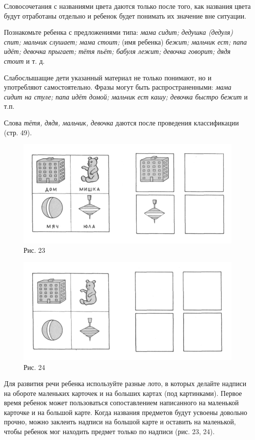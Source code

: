 \documentclass{book}
\renewcommand{\emph}[1]{\textit{#1}}
\begin{document}
Словосочетания с названиями цвета даются только после того, как названия
цвета будут отработаны отдельно и ребенок будет понимать их значение вне
ситуации.

Познакомьте ребенка с предложениями типа: \emph{мама сидит; дедушка
(дедуля) спит; мальчик слушает; мама стоит;} (имя ребенка) \emph{бежит;
мальчик ест; папа идёт; девочка прыгает; тётя пьёт; бабуля лежит;
девочка говорит; дядя стоит} и т. д.

Слабослышащие дети указанный материал не только понимают, но и
употребляют самостоятельно. Фразы могут быть распространенными:
\emph{мама сидит на стуле; папа идёт домой; мальчик ест кашу; девочка
быстро бежит} и т.п.

Слова \emph{тётя, дядя, мальчик, девочка} даются после проведения
классификации (стр. 49).

\begin{figure}
\centering
\includegraphics[width=\linewidth]{media/media/image20.png}
\caption*{Рис. 23}
\end{figure}

\begin{figure}
\centering
\includegraphics[width=\linewidth]{media/media/image21.png}
\caption*{Рис. 24}
\end{figure}

Для развития речи ребенка используйте разные лото, в которых делайте
надписи на обороте маленьких карточек и на больших картах (под
картинками). Первое время ребенок может пользоваться сопоставлением
написанного на маленькой карточке и на большой карте. Когда названия
предметов будут усвоены довольно прочно, можно заклеить надписи на
большой карте и оставить на маленькой, чтобы ребенок мог находить
предмет только по надписи (рис. 23, 24).
\end{document}
